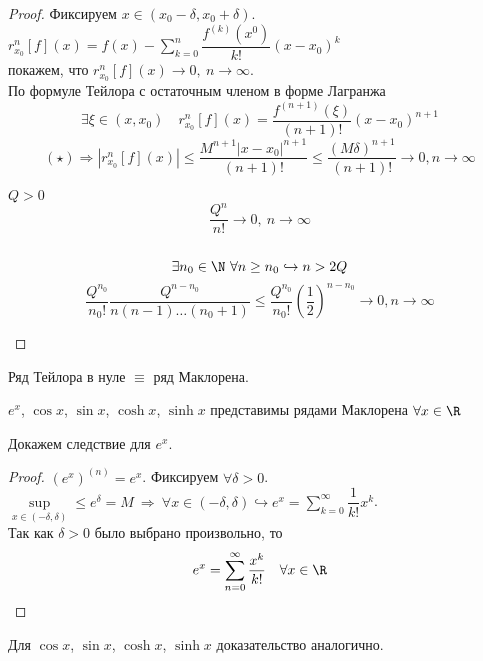 \begin{proof}
    Фиксируем $x \in (x_0 - \delta, x_0 + \delta)$. \\
    $r_{x_0}^n [f](x) = f(x) - \sum\limits_{k = 0}^n \dfrac{f^{(k)} (x^0)}{k!} (x-x_0)^k$ \\
    покажем, что $r_{x_0}^n [f](x) \rightarrow 0, \ n \rightarrow \infty$. \\
    По формуле Тейлора с остаточным членом в форме Лагранжа \\
    $$\exists \xi \in (x, x_0) \quad r_{x_0}^n [f](x) = \dfrac{f^{(n+1)} (\xi)}{(n+1)!} (x-x_0)^{n+1}$$
    $$(\star) \Longrightarrow \left|r_{x_0}^n[f](x)\right| \leq \dfrac{M^{n+1} |x-x_0|^{n + 1}}{(n+1)!} \leq \dfrac{(M \delta)^{n+1}}{(n+1)!} \to 0, n \to\infty$$

    \begin{reminder}
        $Q > 0$ \\
        $$\dfrac{Q^n}{n!} \to 0, \ n \to \infty $$ \\
        $$ \exists  n_0 \in \N \ \forall n \geq n_0 \hookrightarrow n > 2Q $$
        $$ \dfrac{Q^{n_0}}{n_0 !} \dfrac{Q^{n-n_0}}{n(n-1) \dots (n_0 + 1)} \leq \dfrac{Q^{n_0}}{n_0!} \left(\dfrac{1}{2}\right) ^ {n-n_0} \to 0, n \to \infty$$
    \end{reminder}
\end{proof}

Ряд Тейлора в нуле $\equiv$ ряд Маклорена.
\begin{corollary}
$e^x$, $\cos{x}$, $\sin{x}$, $\cosh{x}$, $\sinh{x}$ представимы рядами Маклорена $\forall x \in \R$
\end{corollary}

Докажем следствие для $e^x$. \\
\begin{proof}
    $(e^x)^{(n)} = e^x$. Фиксируем $\forall \delta > 0$. \\
    $\sup \limits_{x \in (-\delta, \delta)} \leq e^{\delta} = M \ \Longrightarrow \ \forall x \in (-\delta, \delta) \hookrightarrow e^x = \sum \limits_{k=0}^{\infty} \dfrac{1}{k!} x^k$. \\
    Так как $\delta > 0$ было выбрано произвольно, то \\
    $$ e^x = \sum \limits_{n=0}^{\infty} \dfrac{x^k}{k!} \quad \forall x \in \R$$
\end{proof}

Для $\cos{x}$, $\sin{x}$, $\cosh{x}$, $\sinh{x}$ доказательство аналогично. \\

